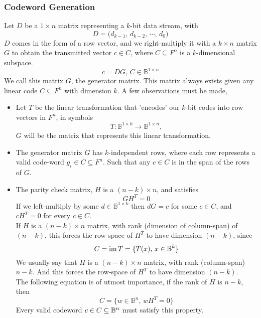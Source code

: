 \documentclass[../../main.tex]{subfiles}
\begin{document}
\subsubsection*{Codeword Generation}
Let $D$ be a $1\times n$ matrix representing a $k$-bit data stream, with
\[
D = \biggl(d_{k-1},\,d_{k-2},\,\cdots,\,d_0\biggr)
\]
$D$ comes in the form of a row vector, and we right-multiply it with a $k\times n$ matrix $G$ to obtain the transmitted vector $c\in C$, where $C\subseteq F^n$ is a $k$-dimensional subspace.
\[
c = DG,\,C\in \mathbb{B}^{1\times n}
\]
We call this matrix $G$, the generator matrix. This matrix always exists given any linear code $C\subseteq F^n$ with dimension $k$. A few observations must be made,
\begin{itemize}
    \item Let $T$ be the linear transformation that 'encodes' our $k$-bit codes into row vectors in $F^n$, in symbols
    \[
    T: \mathbb{B}^{1\times k}\to \mathbb{B}^{1\times n},
    \]
    $G$ will be the matrix that represents this linear transformation. 
    \item The generator matrix $G$ has $k$-independent rows, where each row represents a valid code-word $g_i\in C\subseteq F^n$. Such that any $c\in C$ is in the span of the rows of $G$.
    \item The parity check matrix, $H$ is a $(n-k)\times n$, and satisfies
    \[
    GH^T =0
    \]
    If we left-multiply by some $d\in\mathbb{B}^{1\times k}$ then $dG=c$ for some $c\in C$, and $cH^T = 0$ for every $c\in C$.\\
    
    If $H$ is a $(n-k)\times n$ matrix, with rank (dimension of column-span) of $(n-k)$, this forces the row-space of $H^T$ to have dimension $(n-k)$, since 
    \[
    C = \operatorname{im}{T} = \{T(x),\,x\in \mathbb{B}^k\}
    \]
    We usually say that $H$ is a $(n-k)\times n$ matrix, with rank (column-span) $n-k$. And this forces the row-space of $H^T$ to have dimension $(n-k)$. \\
    
    The following equation is of utmost importance, if the rank of $H$ is $n-k$, then
    \begin{equation}\label{kernel parity-check matrix is C}
    \boxed{C = \{w\in \mathbb{B}^n,\, wH^T = 0\}}
    \end{equation}
    Every valid codeword $c\in C\subseteq \mathbb{B}^n$ must satisfy this property. \\
    

\end{itemize}
\end{document}
